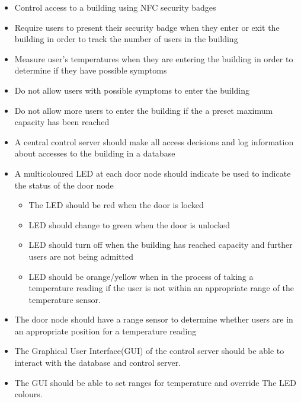 \begin{itemize}
    \item Control access to a building using NFC security badges
    \item Require users to present their security badge when they enter or exit
          the building in order to track the number of users in the building
    \item Measure user's temperatures when they are entering the building in
          order to determine if they have possible symptoms
    \item Do not allow users with possible symptoms to enter the building
    \item Do not allow more users to enter the building if the a preset maximum
          capacity has been reached
    \item A central control server should make all access decisions and log
          information about accesses to the building in a database
    \item A multicoloured LED at each door node should indicate be used to
          indicate the status of the door node
    \begin{itemize}
        \item The LED should be red when the door is locked
        \item LED should change to green when the door is unlocked
        \item LED should turn off when the building has reached capacity and
              further users are not being admitted
        \item LED should be orange/yellow when in the process of taking a temperature
              reading if the user is not within an appropriate range of the
              temperature sensor.
    \end{itemize}
    \item The door node should have a range sensor to determine whether users
          are in an appropriate position for a temperature reading
    \item The Graphical User Interface(GUI) of the control server should be able 
          to interact with the database and control server.
    \item The GUI should be able to set ranges for temperature and override
          The LED colours.
\end{itemize}

